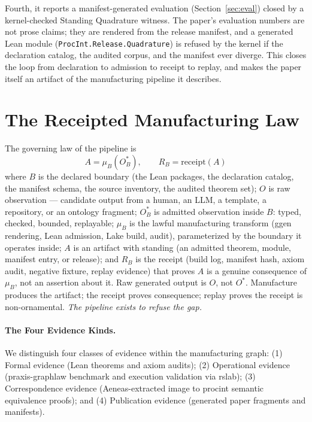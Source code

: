 \documentclass[11pt]{article}
\begin{document}
Fourth, it reports a manifest-generated evaluation
(Section~\ref{sec:eval}) closed by a kernel-checked Standing Quadrature
witness. The paper's evaluation numbers are not prose claims; they are
rendered from the release manifest, and a generated Lean module
(\texttt{ProcInt.Release.Quadrature}) is refused by the kernel if the
declaration catalog, the audited corpus, and the manifest ever diverge.
This closes the loop from declaration to admission to receipt to replay,
and makes the paper itself an artifact of the manufacturing pipeline it
describes.

\section{The Receipted Manufacturing Law}
\label{sec:law}

The governing law of the pipeline is
\[
A = \mu_B(O^*_B), \qquad R_B = \mathrm{receipt}(A)
\]
where \(B\) is the declared boundary (the Lean packages, the declaration
catalog, the manifest schema, the source inventory, the audited theorem
set); \(O\) is raw observation --- candidate output from a human, an LLM,
a template, a repository, or an ontology fragment; \(O^*_B\) is admitted
observation inside \(B\): typed, checked, bounded, replayable; \(\mu_B\) is
the lawful manufacturing transform (\textsf{ggen} rendering, Lean
admission, Lake build, audit), parameterized by the boundary it operates
inside; \(A\) is an artifact with standing (an admitted theorem, module,
manifest entry, or release); and \(R_B\) is the receipt (build log,
manifest hash, axiom audit, negative fixture, replay evidence) that proves
\(A\) is a genuine consequence of \(\mu_B\), not an assertion about it.
Raw generated output is \(O\), not \(O^*\). Manufacture produces the
artifact; the receipt proves consequence; replay proves the receipt is
non-ornamental. \emph{The pipeline exists to refuse the gap.}

\paragraph{The Four Evidence Kinds.} We distinguish four classes of evidence within the manufacturing graph: (1) Formal evidence (Lean theorems and axiom audits); (2) Operational evidence (praxis-graphlaw benchmark and execution validation via rslab); (3) Correspondence evidence (Aeneas-extracted image to procint semantic equivalence proofs); and (4) Publication evidence (generated paper fragments and manifests).
\end{document}
